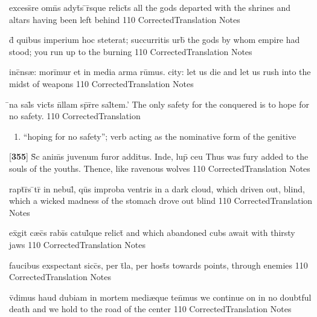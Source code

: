 \latline
  {excess\={}re omn\={}s adyt\={\macron {\i}}s \={}r\={\macron {\i}}sque relict\={\macron {\i}}s}
  { all the gods departed with the shrines and altars having been left behind }
  {110}
  { CorrectedTranslation }
  { Notes }


\latline
  {d\={\macron {\i}} quibus imperium hoc steterat; succurritis urb\={\macron {\i}}}
  { the gods by whom empire had stood; you run up to the burning  }
  {110}
  { CorrectedTranslation }
  { Notes }


\latline
  {inc\={}ns{\ae}: mori\={}mur et in media arma ru\={}mus.}
  { city: let us die and let us rush into the midst of weapons }
  {110}
  { CorrectedTranslation }
  { Notes }


\latline
  {\={}na sal\={}s vict\={\macron {\i}}s n\={}llam sp\={}r\={}re sal\={}tem.'}
  { The only safety for the conquered is to hope for no safety. }
  {110}
  { CorrectedTranslation }
  { \begin{enumerate}
  	\item ``hoping for no safety''; verb acting as the nominative form of the genitive
  \end{enumerate} }


\latline
  {[\textbf{355}] S\={\macron {\i}}c anim\={\macron {\i}}s juvenum furor additus.  Inde, lup\={\macron {\i}} ceu}
  { Thus was fury added to the souls of the youths.  Thence, like ravenous wolves }
  {110}
  { CorrectedTranslation }
  { Notes }


\latline
  {rapt\={}r\={}s \={}tr\={} in nebul\={}, qu\={}s improba ventris}
  { in a dark cloud, which driven out, blind, which a wicked madness of the stomach drove out blind}
  {110}
  { CorrectedTranslation }
  { Notes }


\latline
  {ex\={}git c{\ae}c\={}s rabi\={}s catul\={\macron {\i}}que relict\={\macron {\i}}}
  { and which abandoned cubs await with thirsty jaws }
  {110}
  { CorrectedTranslation }
  { Notes }


\latline
  {faucibus exspectant sicc\={\macron {\i}}s, per t\={}la, per host\={\macron {\i}}s}
  { towards points, through enemies }
  {110}
  { CorrectedTranslation }
  { Notes }


\latline
  {v\={}dimus haud dubiam in mortem medi{\ae}que ten\={}mus}
  { we continue on in no doubtful death and we hold to the road of the center }
  {110}
  { CorrectedTranslation }
  { Notes }


